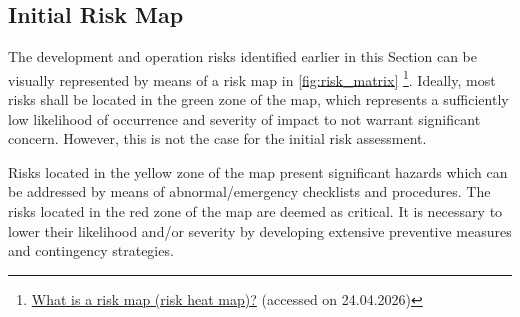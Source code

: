 \subsection{Initial Risk Map}
The development and operation risks identified earlier in this Section can 
be visually represented by means of a risk map in \autoref{fig:risk_matrix} \footnote{\href{https://www.techtarget.com/searchsecurity/definition/risk-map-risk-heat-map}{What is a risk map (risk heat map)?} (accessed on 24.04.2026)}. Ideally, most risks shall be located in the green zone of the map, which represents a sufficiently low likelihood of occurrence and severity of impact to not warrant significant concern. However, this is not the case for the initial risk assessment.

Risks located in the yellow zone of the map present significant hazards which can be addressed by means of abnormal/emergency checklists and procedures. The risks located in the red zone of the map are deemed as critical. It is necessary to lower their likelihood and/or severity by developing extensive preventive measures and contingency strategies.

